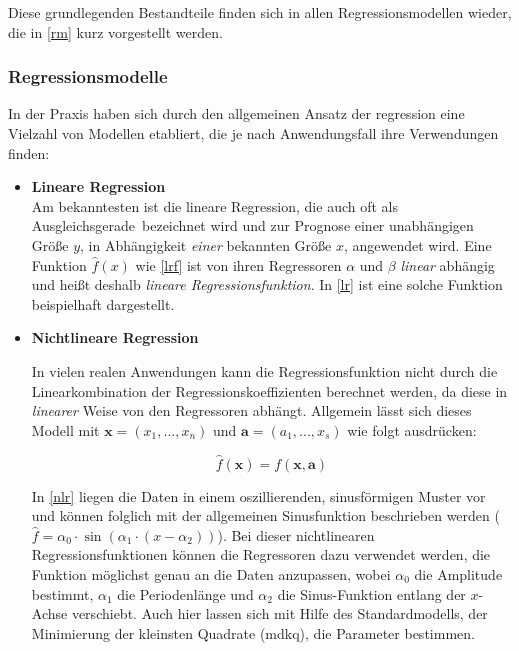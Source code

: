 Diese grundlegenden Bestandteile finden sich in allen Regressionsmodellen wieder, die in \vref{rm} kurz vorgestellt werden. 


\subsubsection{Regressionsmodelle}\label{rm}
In der Praxis haben sich durch den allgemeinen Ansatz der \gls{regression} eine Vielzahl von Modellen etabliert, die je nach Anwendungsfall ihre Verwendungen finden:


\begin{itemize}


\item \textbf{Lineare Regression}
\\ Am bekanntesten ist die lineare Regression, die auch oft als \glqq Ausgleichsgerade\grqq~bezeichnet wird und zur Prognose einer unabhängigen Größe $y$, in Abhängigkeit \textit{einer} bekannten Größe $x$, angewendet wird. Eine Funktion $\hat{f}(x)$ wie \vref{lrf} ist von ihren Regressoren $\alpha$ und $\beta$ \textit{linear} abhängig und heißt deshalb \textit{lineare Regressionsfunktion}.\enlargethispage{\baselineskip} In \vref{lr} ist eine solche Funktion beispielhaft dargestellt.




\item \textbf{Nichtlineare Regression}

In vielen realen Anwendungen kann die Regressionsfunktion nicht durch die Linearkombination der Regressionskoeffizienten berechnet werden, da diese in \textit{linearer} Weise von den Regressoren abhängt. Allgemein lässt sich dieses Modell mit $\boldsymbol{x} = (x_1,...,x_n)$ und $\boldsymbol{a} = (a_1,...,x_s)$ wie folgt ausdrücken:

\begin{equation}
	\hat{f}(\boldsymbol{x}) = f(\boldsymbol{x},\boldsymbol{a})
\end{equation}

In \vref{nlr} liegen die Daten in einem oszillierenden, sinusförmigen Muster vor und können folglich mit der allgemeinen Sinusfunktion beschrieben werden ($\hat{f} = \alpha_0 \cdot \sin(\alpha_1 \cdot (x-\alpha_2))$). Bei dieser nichtlinearen Regressionsfunktionen können die Regressoren dazu verwendet werden, die Funktion möglichst genau an die Daten anzupassen, wobei $\alpha_0$ die Amplitude bestimmt, $\alpha_1$ die Periodenlänge und $\alpha_2$ die Sinus-Funktion entlang der $x$-Achse verschiebt. Auch hier lassen sich mit Hilfe des Standardmodells, der Minimierung der kleinsten Quadrate (\gls{mdkq}), die Parameter bestimmen.


\end{itemize}
